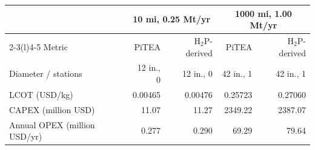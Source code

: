 \begin{tabular}{@{}lrrrr@{}}
\toprule
& \multicolumn{2}{c}{10 mi, 0.25 Mt/yr} & \multicolumn{2}{c}{1000 mi, 1.00 Mt/yr} \\
\cmidrule(lr){2-3}\cmidrule(l){4-5}
Metric & PiTEA & H$_2$P-derived & PiTEA & H$_2$P-derived \\
\midrule
Diameter / stations & 12 in., 0 & 12 in., 0 & 42 in., 1 & 42 in., 1 \\
LCOT (USD/kg) & 0.00465 & 0.00476 & 0.25723 & 0.27060 \\
CAPEX (million USD) & 11.07 & 11.27 & 2349.22 & 2387.07 \\
Annual OPEX (million USD/yr) & 0.277 & 0.290 & 69.29 & 79.64 \\
\bottomrule
\end{tabular}

